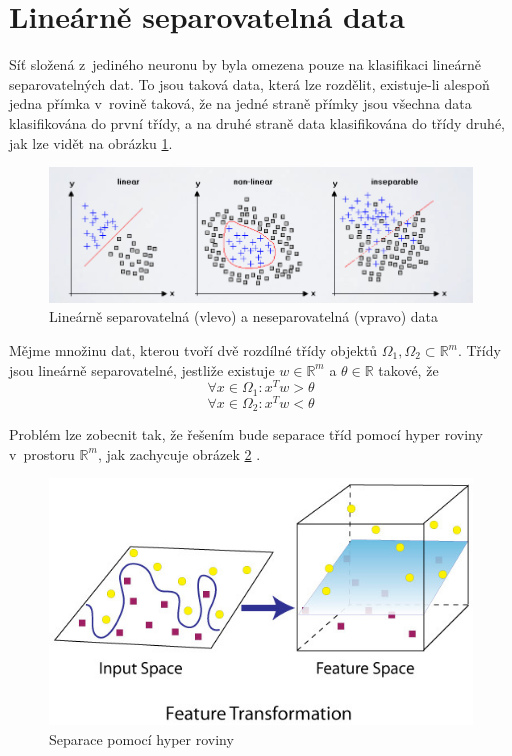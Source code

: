 \section{Lineárně separovatelná data}
Síť složená z~jediného neuronu by byla omezena pouze na klasifikaci lineárně separovatelných dat. To jsou taková data, která lze rozdělit, existuje-li alespoň jedna přímka v~rovině taková, že na jedné straně přímky jsou všechna data klasifikována do první třídy, a na druhé straně data klasifikována do třídy druhé, jak lze vidět na obrázku \ref{fig:linear_separable}.

\begin{figure}[H]
    \centering
    \includegraphics[scale=0.38]{obrazky-figures/linear_separable.png}
    \caption{\label{fig:linear_separable}Lineárně separovatelná (vlevo) a neseparovatelná (vpravo) data} 
\end{figure}

Mějme množinu dat, kterou tvoří dvě rozdílné třídy objektů $\Omega_1, \Omega_2 \subset \mathbb{R}^m$. Třídy jsou lineárně separovatelné, jestliže existuje $w \in 
\mathbb{R}^m$ a $\theta \in \mathbb{R}$ takové, že 
\begin{equation}
   \forall x \in \Omega_1 : x^Tw > \theta
\end{equation}
\begin{equation}
   \forall x \in \Omega_2 : x^Tw < \theta
\end{equation}

Problém lze zobecnit tak, že řešením bude separace tříd pomocí hyper roviny v~prostoru $\mathbb{R}^m$, jak zachycuje obrázek \ref{fig:hyperplane_separable}
\cite{linearseparability}.

\begin{figure}[H]
    \centering
    \includegraphics[scale=0.8]{obrazky-figures/hyperplane_separable.jpeg}
    \caption{\label{fig:hyperplane_separable}Separace pomocí hyper roviny} 
\end{figure}

